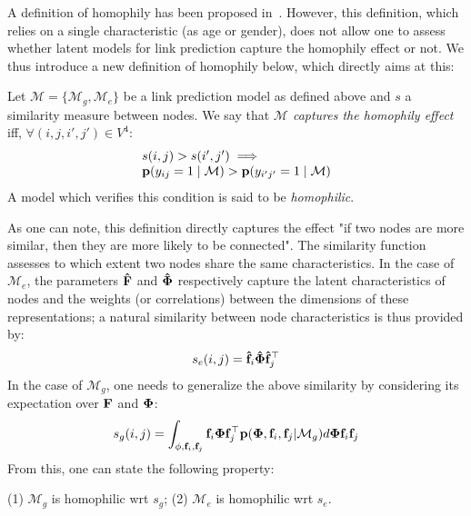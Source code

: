 A definition of homophily has been proposed in~\cite{la2010randomization}. However, this definition, which relies on a single characteristic (as age or gender), does not allow one to assess whether latent models for link prediction capture the homophily effect or not. We thus introduce a new definition of homophily below, which directly aims at this:
%
\begin{definition}[Homophily]
	Let $\mathcal{M}=\{\mathcal{M}_g,\mathcal{M}_e\}$ be a link prediction model as defined above and $s$ a similarity measure between nodes. We say that \emph{$\mathcal{M}$ captures the homophily effect} iff, $\forall (i,j,i',j') \in V^4$:
%
\begin{equation}
\begin{array}{l}
s(i,j) > s(i',j')  \implies \nonumber \\
\mathbf{p}(y_{ij}=1 \mid \mathcal{M}) > \mathbf{p}(y_{i'j'}=1  \mid \mathcal{M}) \nonumber
\end{array}
\end{equation}
%
A model which verifies this condition is said to be \emph{homophilic}.
\end{definition}
%
As one can note, this definition directly captures the effect "if two nodes are more similar, then they are more likely to be connected". The similarity function assesses to which extent two nodes share the same characteristics. In the case of $\mathcal{M}_e$, the parameters $\mathbf{\hat{F}}$ and $\mathbf{\hat{\Phi}}$ respectively capture the latent characteristics of nodes and the weights (or correlations) between the dimensions of these representations; a natural similarity between node characteristics is thus provided by:
%
\begin{equation}
s_e(i,j) = \mathbf{\hat{f}}_{i} \mathbf{\hat{\Phi}} \mathbf{\hat{f}}_j^\top
\label{eq:natural-sim}
\end{equation}
%
In the case of $\mathcal{M}_g$, one needs to generalize the above similarity by considering its expectation over $\mathbf{F}$ and $\mathbf{\Phi}$:
%
\begin{equation}
s_g(i,j) = \int_{\mathbf{\phi},\mathbf{f}_i,\mathbf{f}_j} \mathbf{f}_i \mathbf{\Phi} \mathbf{f}_j^\top \mathbf{p}(\mathbf{\Phi},\mathbf{f}_i,\mathbf{f}_j|\mathcal{M}_g)  d\mathbf{\Phi}\mathbf{f}_i\mathbf{f}_j
\label{eq:natural-sim}
\end{equation}
%
From this, one can state the following property:
%
\begin{proposition}[] (1) $\mathcal{M}_g$ is homophilic wrt $s_g$; (2) $\mathcal{M}_e$ is homophilic wrt $s_e$.
\end{proposition}
